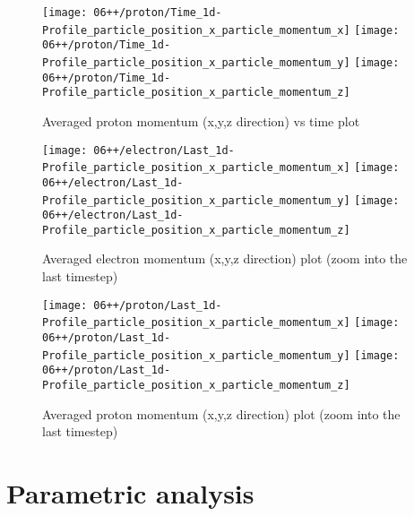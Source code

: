 \begin{figure}
  \centering
  {\texttt{[image: 06++/proton/Time\_1d-Profile\_particle\_position\_x\_particle\_momentum\_x]}}
  {\texttt{[image: 06++/proton/Time\_1d-Profile\_particle\_position\_x\_particle\_momentum\_y]}}
  {\texttt{[image: 06++/proton/Time\_1d-Profile\_particle\_position\_x\_particle\_momentum\_z]}}
\caption{Averaged proton momentum (x,y,z direction) vs time plot}
\end{figure}

\begin{figure}
  \centering
  {\texttt{[image: 06++/electron/Last\_1d-Profile\_particle\_position\_x\_particle\_momentum\_x]}}
  {\texttt{[image: 06++/electron/Last\_1d-Profile\_particle\_position\_x\_particle\_momentum\_y]}}
  {\texttt{[image: 06++/electron/Last\_1d-Profile\_particle\_position\_x\_particle\_momentum\_z]}}
\caption{Averaged electron momentum (x,y,z direction) plot (zoom into the last timestep)}
\label{fig:06++_e_m}
\end{figure}

\begin{figure}
  \centering
  {\texttt{[image: 06++/proton/Last\_1d-Profile\_particle\_position\_x\_particle\_momentum\_x]}}
  {\texttt{[image: 06++/proton/Last\_1d-Profile\_particle\_position\_x\_particle\_momentum\_y]}}
  {\texttt{[image: 06++/proton/Last\_1d-Profile\_particle\_position\_x\_particle\_momentum\_z]}}
\caption{Averaged proton momentum (x,y,z direction) plot (zoom into the last timestep)}
\label{fig:06++_p_m}
\end{figure}

\section{Parametric analysis}

